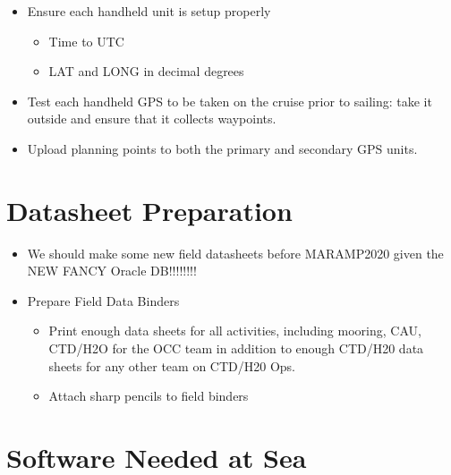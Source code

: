 \documentclass[]{book}
\providecommand{\tightlist}{%
  \setlength{\itemsep}{0pt}\setlength{\parskip}{0pt}}
\begin{document}
\begin{itemize}
\tightlist
\item
  Ensure each handheld unit is setup properly

  \begin{itemize}
  \tightlist
  \item
    Time to UTC
  \item
    LAT and LONG in decimal degrees
  \end{itemize}
\item
  Test each handheld GPS to be taken on the cruise prior to sailing: take it outside and ensure that it collects waypoints.
\item
  Upload planning points to both the primary and secondary GPS units.
\end{itemize}

\hypertarget{datasheet-preparation}{%
\section{Datasheet Preparation}\label{datasheet-preparation}}

\begin{itemize}
\item
  We should make some new field datasheets before MARAMP2020 given the NEW FANCY Oracle DB!!!!!!!!
\item
  Prepare Field Data Binders

  \begin{itemize}
  \tightlist
  \item
    Print enough data sheets for all activities, including mooring, CAU, CTD/H2O for the OCC team in addition to enough CTD/H20 data sheets for any other team on CTD/H20 Ops.
  \item
    Attach sharp pencils to field binders
  \end{itemize}
\end{itemize}

\hypertarget{software-needed-at-sea}{%
\section{Software Needed at Sea}\label{software-needed-at-sea}}
\end{document}
